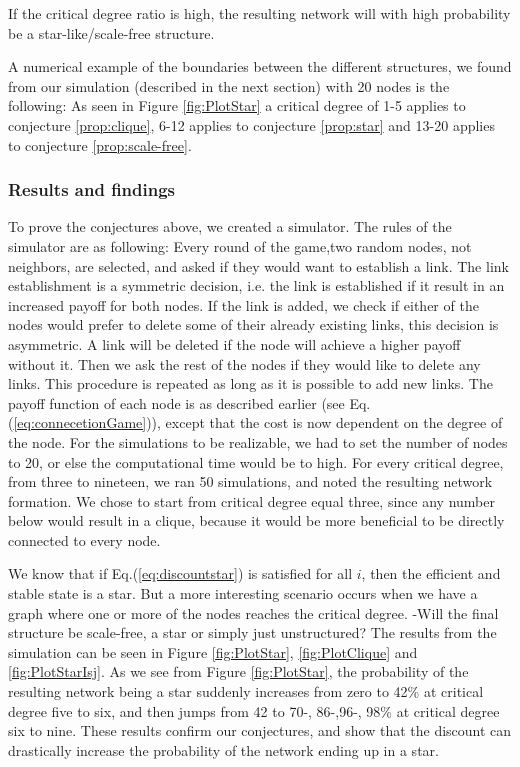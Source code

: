 \begin{cnj}
If the critical degree ratio is high, the resulting network will with high probability be a star-like/scale-free structure. 
\label{prop:scale-free}
\end{cnj}

A numerical example of the boundaries between the different structures, we found from our simulation (described in the next section) with 20 nodes is the following: 
As seen in Figure \ref{fig:PlotStar} a critical degree of 1-5 applies to conjecture \ref{prop:clique}, 6-12 applies to conjecture \ref{prop:star} and 13-20 applies to conjecture \ref{prop:scale-free}. 

\subsubsection{Results and findings}

To prove the conjectures above, we created a simulator. The rules of the simulator are as following:
Every round of the game,two random nodes, not neighbors, are selected, and asked if they would want to establish a link. The link establishment is a symmetric decision, i.e. the link is established if it result in an increased payoff for both nodes. If the link is added, we check if either of the nodes would prefer to delete some of their already existing links, this decision is asymmetric. A link will be deleted if the node will achieve a higher payoff without it. Then we ask the rest of the nodes if they would like to delete any links. This procedure is repeated as long as it is possible to add new links. 
The payoff function of each node is as described earlier (see Eq.(\ref{eq:connecetionGame})), except that the cost is now dependent on the degree of the node. For the simulations to be realizable, we had to set the number of nodes to 20, or else the computational time would be to high. For every critical degree, from three to nineteen, we ran 50 simulations, and noted the resulting network formation. We chose to start from critical degree equal three, since any number below would result in a clique, because it would be more beneficial to be directly connected to every node.  

We know that if Eq.(\ref{eq:discountstar}) is satisfied for all $i$, then the efficient and stable state is a star. But a more interesting scenario occurs when we have a graph where one or more of the nodes reaches the critical degree. -Will the final structure be scale-free, a star or simply just unstructured? 
The results from the simulation can be seen in Figure \ref{fig:PlotStar}, \ref{fig:PlotClique} and \ref{fig:PlotStarIsj}. As we see from Figure \ref{fig:PlotStar}, the probability of the resulting network being a star suddenly increases from zero to 42\% at critical degree five to six, and then jumps from 42 to 70-, 86-,96-, 98\% at critical degree six to nine. These results confirm our conjectures, and show that the discount can drastically increase the probability of the network ending up in a star. 

